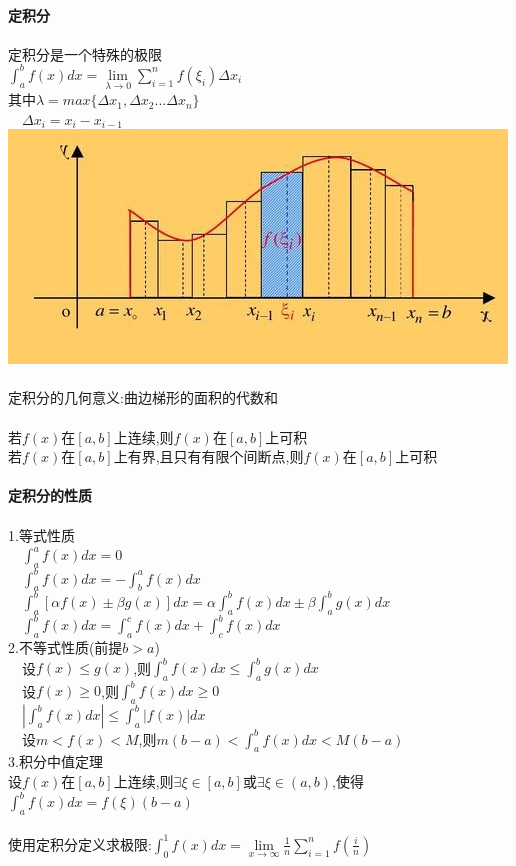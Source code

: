 \documentclass{article}
\begin{document}
\begin{flushleft}
	\fontsize{24pt}{30pt}\selectfont
	~\\ \textbf{定积分} \\~\\
	定积分是一个特殊的极限\\
	$\int_{a}^{b}f(x)dx=\lim\limits_{\lambda\to 0}\sum_{i=1}^{n}f(\xi_i)\Delta x_i$\\
	其中$\lambda = max\{\Delta x_1, \Delta x_2...\Delta x_n\}$\\
	\ \ $\Delta x_i=x_i-x_{i-1}$\\
	\includegraphics[scale=1.0]{2.jpg}\\
	~\\
	定积分的几何意义:曲边梯形的面积的代数和\\
	~\\
	若$f(x)$在$[a,b]$上连续,则$f(x)$在$[a,b]$上可积\\
	若$f(x)$在$[a,b]$上有界,且只有有限个间断点,则$f(x)$在$[a,b]$上可积\\
	~\\ \textbf{定积分的性质} \\~\\
	1.等式性质\\
	\ \ $\int_{a}^{a}f(x)dx=0$\\
	\ \ $\int_{a}^{b}f(x)dx=-\int_{b}^{a}f(x)dx$\\
	\ \ $\int_{a}^{b}[\alpha f(x)\pm \beta g(x)]dx=\alpha\int_{a}^{b}f(x)dx\pm \beta\int_{a}^{b}g(x)dx$\\
	\ \ $\int_{a}^{b}f(x)dx=\int_{a}^{c}f(x)dx+\int_{c}^{b}f(x)dx$\\
	2.不等式性质(前提$b>a$)\\
	\ \ 设$f(x)\le g(x)$,则$\int_{a}^{b}f(x)dx\le \int_{a}^{b}g(x)dx$\\
	\ \ 设$f(x)\ge 0$,则$\int_{a}^{b}f(x)dx \ge 0$\\
	\ \ $|\int_{a}^{b}f(x)dx| \le \int_{a}^{b}|f(x)|dx$\\
	\ \ 设$m<f(x)<M$,则$m(b-a)<\int_{a}^{b}f(x)dx<M(b-a)$\\
	3.积分中值定理\\
	设$f(x)$在$[a,b]$上连续,则$\exists \xi \in [a,b]$或$\exists \xi \in (a,b)$,使得$\int_{a}^{b}f(x)dx=f(\xi)(b-a)$\\
	~\\
	使用定积分定义求极限:$\int_{0}^{1}f(x)dx=\lim\limits_{x\to \infty}\frac{1}{n}\sum_{i=1}^{n}f(\frac{i}{n})$\\
	
\end{flushleft}
\end{document}

